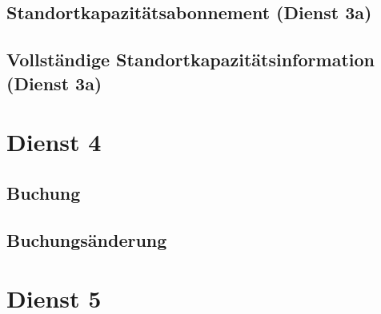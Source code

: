 \subsection*{Standortkapazitätsabonnement (Dienst 3a)}
\label{subsec:Nachrichten:Dienst3:PlaceAvailabilitySubscription}







\subsection*{Vollständige Standortkapazitätsinformation (Dienst 3a)}
\label{subsec:Nachrichten:Dienst3:CompletePlaceAvailability}





\section{Dienst 4}
\label{subsec:Nachrichten:Dienst4}

\subsection*{Buchung}
\label{subsec:Nachrichten:Dienst4:Booking}





\subsection*{Buchungsänderung}
\label{subsec:Nachrichten:Dienst4:ChangeBooking}





\section{Dienst 5}
\label{subsec:Nachrichten:Dienst5}

